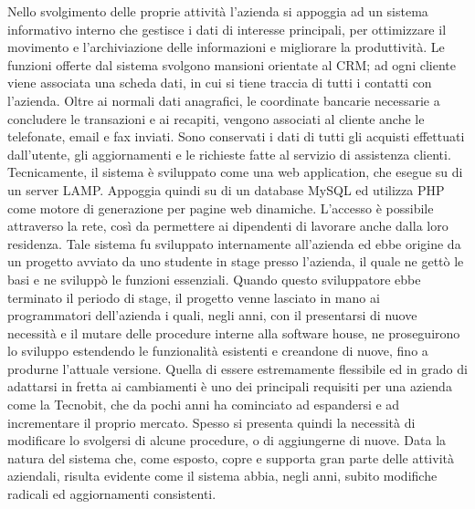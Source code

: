 Nello svolgimento delle proprie attivit\`a l'azienda si appoggia ad un sistema
informativo interno che gestisce i dati di interesse principali, per ottimizzare
il movimento e l'archiviazione delle informazioni e migliorare la
produttivit\`a.
Le funzioni offerte dal sistema svolgono mansioni orientate al CRM; ad ogni
cliente viene associata una scheda dati, in cui si tiene traccia di tutti i contatti con l'azienda. Oltre ai normali dati anagrafici, le
coordinate bancarie necessarie a concludere le transazioni e ai recapiti,
vengono associati al cliente anche le telefonate, email e fax inviati. Sono
conservati i dati di tutti gli acquisti effettuati dall'utente, gli
aggiornamenti e le richieste fatte al servizio di assistenza clienti.
Tecnicamente, il sistema \`e sviluppato come una web application, che esegue su
di un server LAMP. Appoggia quindi su di un database MySQL ed utilizza PHP come
motore di generazione per pagine web dinamiche. L'accesso \`e possibile
attraverso la rete, così da permettere ai dipendenti di lavorare anche dalla
loro residenza.
Tale sistema fu sviluppato internamente all'azienda ed ebbe origine da un
progetto avviato da uno studente in stage presso l'azienda, il quale ne gett\`o
le basi e ne svilupp\`o le funzioni essenziali. Quando questo sviluppatore ebbe
terminato il periodo di stage, il progetto venne lasciato in mano ai
programmatori dell'azienda i quali, negli anni, con il presentarsi di nuove
necessit\`a e il mutare delle procedure interne alla software house, ne
proseguirono lo sviluppo estendendo le funzionalit\`a esistenti e creandone di
nuove, fino a produrne
l'attuale versione. Quella di essere estremamente flessibile ed in grado di
adattarsi in fretta ai cambiamenti \`e uno dei principali requisiti per una
azienda come la Tecnobit, che da pochi anni ha cominciato ad espandersi e ad
incrementare il proprio mercato. Spesso si presenta quindi la necessit\`a di
modificare lo svolgersi di alcune procedure, o di aggiungerne di nuove. Data la
natura del sistema che, come esposto, copre e supporta gran parte delle
attivit\`a aziendali, risulta evidente come il sistema abbia, negli anni, subito
modifiche radicali ed aggiornamenti consistenti.


